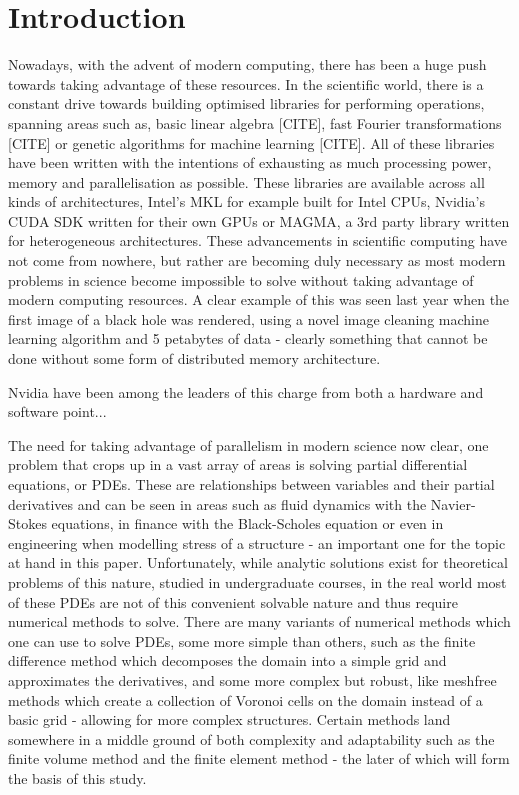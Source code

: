 \clearpage
\chapter{Introduction}

Nowadays, with the advent of modern computing, there has been a huge push towards taking advantage of these resources. In the scientific world, there is a constant drive towards building optimised libraries for performing operations, spanning areas such as, basic linear algebra [CITE], fast Fourier transformations [CITE] or genetic algorithms for machine learning [CITE]. All of these libraries have been written with the intentions of exhausting as much processing power, memory and parallelisation as possible. These libraries are available across all kinds of architectures, Intel's MKL for example built for Intel CPUs, Nvidia's CUDA SDK written for their own GPUs or MAGMA, a 3rd party library written for heterogeneous architectures. These advancements in scientific computing have not come from nowhere, but rather are becoming duly necessary as most modern problems in science become impossible to solve without taking advantage of modern computing resources. A clear example of this was seen last year when the first image of a black hole was rendered, using a novel image cleaning machine learning algorithm and 5 petabytes of data - clearly something that cannot be done without some form of distributed memory architecture.

Nvidia have been among the leaders of this charge from both a hardware and software point...

The need for taking advantage of parallelism in modern science now clear, one problem that crops up in a vast array of areas is solving partial differential equations, or PDEs. These are relationships between variables and their partial derivatives and can be seen in areas such as fluid dynamics with the Navier-Stokes equations, in finance with the Black-Scholes equation or even in engineering when modelling stress of a structure - an important one for the topic at hand in this paper. Unfortunately, while analytic solutions exist for theoretical problems of this nature, studied in undergraduate courses, in the real world most of these PDEs are not of this convenient solvable nature and thus require numerical methods to solve. There are many variants of numerical methods which one can use to solve PDEs, some more simple than others, such as the finite difference method which decomposes the domain into a simple grid and approximates the derivatives, and some more complex but robust, like meshfree methods which create a collection of Voronoi cells on the domain instead of a basic grid - allowing for more complex structures. Certain methods land somewhere in a middle ground of both complexity and adaptability such as the finite volume method and the finite element method - the later of which will form the basis of this study.
 
